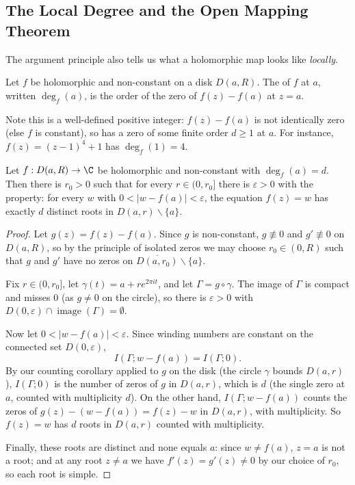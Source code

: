 \subsection{The Local Degree and the Open Mapping Theorem}

The argument principle also tells us what a holomorphic map looks like \emph{locally}.

\begin{definition}
    Let $f$ be holomorphic and non-constant on a disk $D(a, R)$. The  of $f$ at $a$, written $\deg_f(a)$, is the order of the zero of $f(z) - f(a)$ at $z = a$.
\end{definition}

Note this is a well-defined positive integer: $f(z) - f(a)$ is not identically zero (else $f$ is constant), so has a zero of some finite order $d \geq 1$ at $a$. For instance, $f(z) = (z - 1)^4 + 1$ has $\deg_f(1) = 4$.

\begin{theorem}
    Let $f: D(a, R) \rightarrow \C$ be holomorphic and non-constant with $\deg_f(a) = d$. Then there is $r_0 > 0$ such that for every $r \in (0, r_0]$ there is $\varepsilon > 0$ with the property: for every $w$ with $0 < |w - f(a)| < \varepsilon$, the equation $f(z) = w$ has exactly $d$ distinct roots in $D(a, r) \backslash \{a\}$.
\end{theorem}
\begin{proof}
    Let $g(z) = f(z) - f(a)$. Since $g$ is non-constant, $g \not\equiv 0$ and $g' \not\equiv 0$ on $D(a, R)$, so by the principle of isolated zeros we may choose $r_0 \in (0, R)$ such that $g$ and $g'$ have no zeros on $\overline{D(a, r_0)} \backslash \{a\}$.

    Fix $r \in (0, r_0]$, let $\gamma(t) = a + re^{2 \pi i t}$, and let $\Gamma = g \circ \gamma$. The image of $\Gamma$ is compact and misses $0$ (as $g \neq 0$ on the circle), so there is $\varepsilon > 0$ with $D(0, \varepsilon) \cap \operatorname{image}(\Gamma) = \emptyset$.

    Now let $0 < |w - f(a)| < \varepsilon$. Since winding numbers are constant on the connected set $D(0, \varepsilon)$,
    $$
    I(\Gamma; w - f(a)) = I(\Gamma; 0).
    $$
    By our counting corollary applied to $g$ on the disk (the circle $\gamma$ bounds $D(a, r)$), $I(\Gamma; 0)$ is the number of zeros of $g$ in $D(a, r)$, which is $d$ (the single zero at $a$, counted with multiplicity $d$). On the other hand, $I(\Gamma; w - f(a))$ counts the zeros of $g(z) - (w - f(a)) = f(z) - w$ in $D(a, r)$, with multiplicity. So $f(z) = w$ has $d$ roots in $D(a, r)$ counted with multiplicity.

    Finally, these roots are distinct and none equals $a$: since $w \neq f(a)$, $z = a$ is not a root; and at any root $z \neq a$ we have $f'(z) = g'(z) \neq 0$ by our choice of $r_0$, so each root is simple.
\end{proof}

